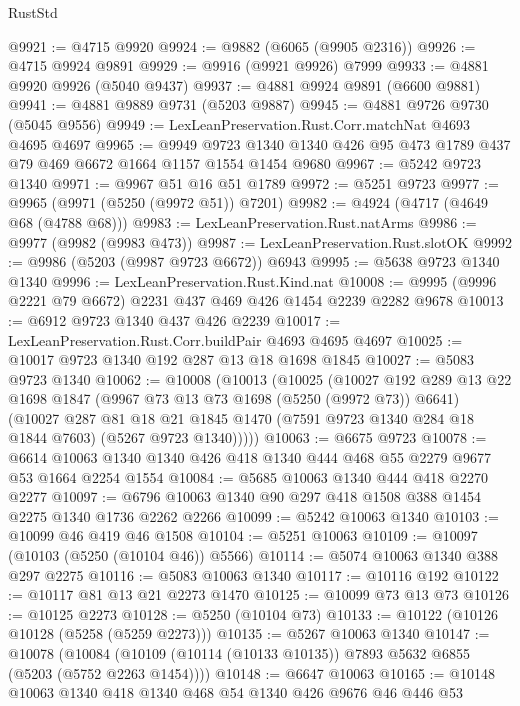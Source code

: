 \begin{lexlean}{RustStd}
\begin{coremodule}
@9921 := @4715 @9920
@9924 := @9882 (@6065 (@9905 @2316))
@9926 := @4715 @9924 @9891
@9929 := @9916 (@9921 @9926) @7999
@9933 := @4881 @9920 @9926 (@5040 @9437)
@9937 := @4881 @9924 @9891 (@6600 @9881)
@9941 := @4881 @9889 @9731 (@5203 @9887)
@9945 := @4881 @9726 @9730 (@5045 @9556)
@9949 := LexLeanPreservation.Rust.Corr.matchNat @4693 @4695 @4697
@9965 := @9949
    @9723
    @1340
    @1340
    @426
    @95
    @473
    @1789
    @437
    @79
    @469
    @6672
    @1664
    @1157
    @1554
    @1454
    @9680
@9967 := @5242 @9723 @1340
@9971 := @9967 @51 @16 @51 @1789
@9972 := @5251 @9723
@9977 := @9965 (@9971 (@5250 (@9972 @51)) @7201)
@9982 := @4924 (@4717 (@4649 @68 (@4788 @68)))
@9983 := LexLeanPreservation.Rust.natArms
@9986 := @9977 (@9982 (@9983 @473))
@9987 := LexLeanPreservation.Rust.slotOK
@9992 := @9986 (@5203 (@9987 @9723 @6672)) @6943
@9995 := @5638 @9723 @1340 @1340
@9996 := LexLeanPreservation.Rust.Kind.nat
@10008 := @9995 (@9996 @2221 @79 @6672) @2231 @437 @469 @426 @1454 @2239 @2282 @9678
@10013 := @6912 @9723 @1340 @437 @426 @2239
@10017 := LexLeanPreservation.Rust.Corr.buildPair @4693 @4695 @4697
@10025 := @10017 @9723 @1340 @192 @287 @13 @18 @1698 @1845
@10027 := @5083 @9723 @1340
@10062 := @10008
    (@10013
      (@10025
        (@10027
          @192
          @289
          @13
          @22
          @1698
          @1847
          (@9967 @73 @13 @73 @1698 (@5250 (@9972 @73)) @6641)
          (@10027
            @287
            @81
            @18
            @21
            @1845
            @1470
            (@7591 @9723 @1340 @284 @18 @1844 @7603)
            (@5267 @9723 @1340)))))
@10063 := @6675 @9723
@10078 := @6614 @10063 @1340 @1340 @426 @418 @1340 @444 @468 @55 @2279 @9677 @53 @1664 @2254 @1554
@10084 := @5685 @10063 @1340 @444 @418 @2270 @2277
@10097 := @6796 @10063 @1340 @90 @297 @418 @1508 @388 @1454 @2275 @1340 @1736 @2262 @2266
@10099 := @5242 @10063 @1340
@10103 := @10099 @46 @419 @46 @1508
@10104 := @5251 @10063
@10109 := @10097 (@10103 (@5250 (@10104 @46)) @5566)
@10114 := @5074 @10063 @1340 @388 @297 @2275
@10116 := @5083 @10063 @1340
@10117 := @10116 @192
@10122 := @10117 @81 @13 @21 @2273 @1470
@10125 := @10099 @73 @13 @73
@10126 := @10125 @2273
@10128 := @5250 (@10104 @73)
@10133 := @10122 (@10126 @10128 (@5258 (@5259 @2273)))
@10135 := @5267 @10063 @1340
@10147 := @10078
    (@10084 (@10109 (@10114 (@10133 @10135)) @7893 @5632 @6855 (@5203 (@5752 @2263 @1454))))
@10148 := @6647 @10063
@10165 := @10148
    @10063
    @1340
    @418
    @1340
    @468
    @54
    @1340
    @426
    @9676
    @46
    @446
    @53

\end{coremodule}
\end{lexlean}
